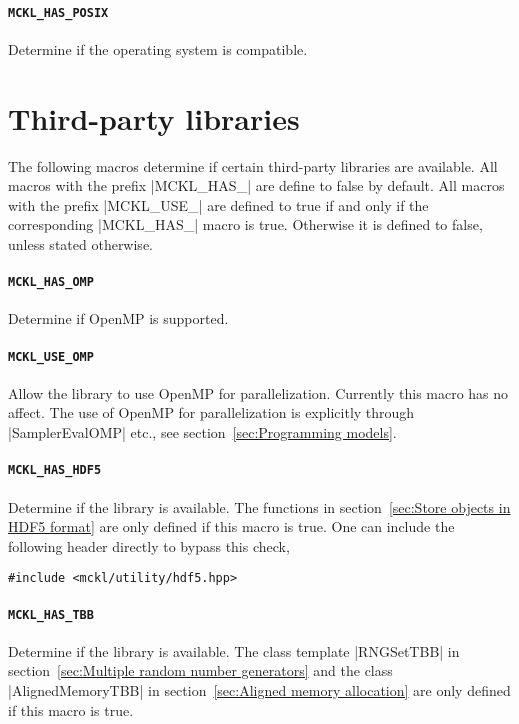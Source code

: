 \paragraph{\texttt{MCKL\_HAS\_POSIX}} Determine if the operating system is
\posix compatible.

\section{Third-party libraries}
\label{sec:Third-party libraries}

The following macros determine if certain third-party libraries are available.
All macros with the prefix |MCKL_HAS_| are define to false by default. All
macros with the prefix |MCKL_USE_| are defined to true if and only if the
corresponding |MCKL_HAS_| macro is true. Otherwise it is defined to false,
unless stated otherwise.

\paragraph{\texttt{MCKL\_HAS\_OMP}} Determine if OpenMP is supported.

\paragraph{\texttt{MCKL\_USE\_OMP}} Allow the library to use OpenMP for
parallelization. Currently this macro has no affect. The use of OpenMP for
parallelization is explicitly through |SamplerEvalOMP| etc., see
section~\ref{sec:Programming models}.

\paragraph{\texttt{MCKL\_HAS\_HDF5}} Determine if the \hdf library is
available. The functions in section~\ref{sec:Store objects in HDF5 format} are
only defined if this macro is true. One can include the following header
directly to bypass this check,
\begin{verbatim}
#include <mckl/utility/hdf5.hpp>
\end{verbatim}

\paragraph{\texttt{MCKL\_HAS\_TBB}} Determine if the \tbb library is available.
The class template |RNGSetTBB| in section~\ref{sec:Multiple random number
  generators} and the class |AlignedMemoryTBB| in section~\ref{sec:Aligned
memory allocation} are only defined if this macro is true.

